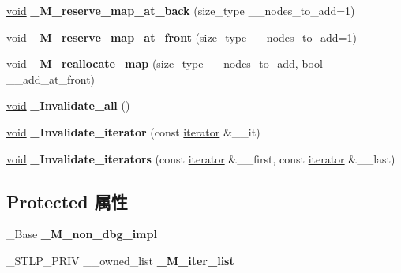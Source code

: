 \begin{DoxyCompactItemize}
\item 
\mbox{\label{classdeque_ab4e0e4642cd00ce0a136f02866a21987}} 
\hyperlink{interfacevoid}{void} {\bfseries \+\_\+\+M\+\_\+reserve\+\_\+map\+\_\+at\+\_\+back} (size\+\_\+type \+\_\+\+\_\+nodes\+\_\+to\+\_\+add=1)
\item 
\mbox{\label{classdeque_a923ef04f6203145648a8d68d3058bf62}} 
\hyperlink{interfacevoid}{void} {\bfseries \+\_\+\+M\+\_\+reserve\+\_\+map\+\_\+at\+\_\+front} (size\+\_\+type \+\_\+\+\_\+nodes\+\_\+to\+\_\+add=1)
\item 
\mbox{\label{classdeque_a8e95db5142763be58fed5569ac8d665d}} 
\hyperlink{interfacevoid}{void} {\bfseries \+\_\+\+M\+\_\+reallocate\+\_\+map} (size\+\_\+type \+\_\+\+\_\+nodes\+\_\+to\+\_\+add, bool \+\_\+\+\_\+add\+\_\+at\+\_\+front)
\item 
\mbox{\label{classdeque_a78179ad31e64bee7403e470d819b9f40}} 
\hyperlink{interfacevoid}{void} {\bfseries \+\_\+\+Invalidate\+\_\+all} ()
\item 
\mbox{\label{classdeque_a285c140323b3b127975cab845c731ebb}} 
\hyperlink{interfacevoid}{void} {\bfseries \+\_\+\+Invalidate\+\_\+iterator} (const \hyperlink{structiterator}{iterator} \&\+\_\+\+\_\+it)
\item 
\mbox{\label{classdeque_a152b6175bbb75f622d2b200ec730c8eb}} 
\hyperlink{interfacevoid}{void} {\bfseries \+\_\+\+Invalidate\+\_\+iterators} (const \hyperlink{structiterator}{iterator} \&\+\_\+\+\_\+first, const \hyperlink{structiterator}{iterator} \&\+\_\+\+\_\+last)
\end{DoxyCompactItemize}
\subsection*{Protected 属性}
\begin{DoxyCompactItemize}
\item 
\mbox{\label{classdeque_a1d95b4cf3e5f27c64f2d05c4f62ca293}} 
\+\_\+\+Base {\bfseries \+\_\+\+M\+\_\+non\+\_\+dbg\+\_\+impl}
\item 
\mbox{\label{classdeque_a9239c465370cf751efa43b2ab805b591}} 
\+\_\+\+S\+T\+L\+P\+\_\+\+P\+R\+IV \+\_\+\+\_\+owned\+\_\+list {\bfseries \+\_\+\+M\+\_\+iter\+\_\+list}
\end{DoxyCompactItemize}


